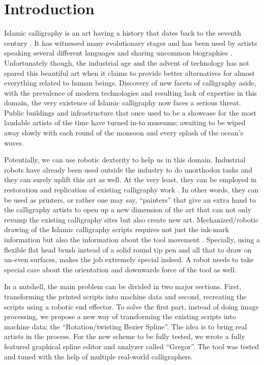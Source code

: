 \section{Introduction}
{
    Islamic calligraphy is an art having a history that dates back to the seventh century \cite{bib01, bib02}. It has witnessed many evolutionary stages \cite{bib02, bib03} and has been used by artists speaking several different languages \cite{bib04} and sharing uncommon biographies \cite{bib05,bib06,bib07,bib08}. Unfortunately though, the industrial age and the advent of technology has not spared this beautiful art when it claims to provide better alternatives for almost everything related to human beings. Discovery of new facets of calligraphy aside, with the prevalence of modern technologies and resulting lack of expertise in this domain, the very existence of Islamic calligraphy now faces a serious threat. Public buildings and infrastructure that once used to be a showcase for the most laudable artists of the time have turned in-to museums; awaiting to be wiped away slowly with each round of the monsoon and every splash of the ocean’s waves.

    Potentially, we can use robotic dexterity to help us in this domain. Industrial robots have already been used outside the industry to do unorthodox tasks \cite{bib09, bib10,bib11,bib12} and they can surely uplift this art as well. At the very least, they can be employed in restoration and replication of existing calligraphy work \cite{bib13}. In other words, they can be used as printers, or rather one may say, “painters” that give an extra hand to the calligraphy artists to open up a new dimension of the art that can not only revamp the existing calligraphy sites but also create new art.
    Mechanized/robotic drawing of the Islamic calligraphy scripts requires not just the ink-mark information but also the information about the tool movement \cite{bib03}. Specially, using a flexible flat head brush instead of a solid round tip pen and all that to draw on un-even surfaces, makes the job extremely special indeed. A robot needs to take special care about the orientation and downwards force of the tool as well.

    In a nutshell, the main problem can be divided in two major sections. First, transforming the printed scripts into machine data and second, recreating the scripts using a robotic end effector.
    To solve the first part, instead of doing image processing, we propose a new way of transforming the existing scripts into machine data; the “Rotation/twisting Bezier Spline”. The idea is to bring real artists in the process. For the new scheme to be fully tested, we wrote a fully featured graphical spline editor and analyzer called “Gregor”. The tool was tested and tuned with the help of multiple real-world calligraphers.

}
